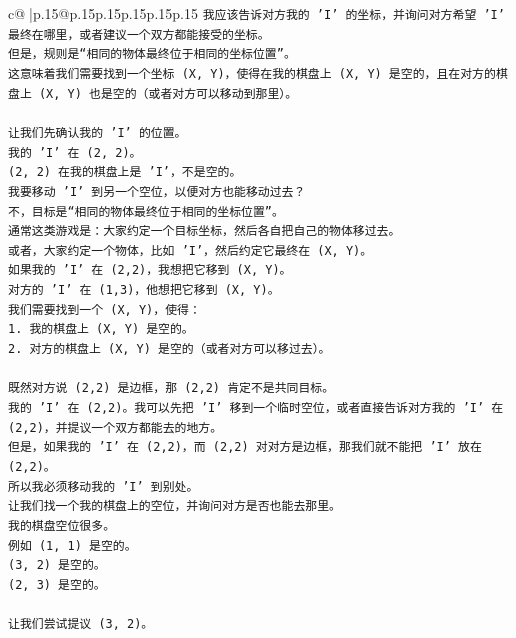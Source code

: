 \documentclass{article}
\begin{document}
{\begin{supertabular}{c@{$\;$}|p{.15\linewidth}@{}p{.15\linewidth}p{.15\linewidth}p{.15\linewidth}p{.15\linewidth}p{.15\linewidth}}
{{{\texttt{我应该告诉对方我的 'I' 的坐标，并询问对方希望 'I' 最终在哪里，或者建议一个双方都能接受的坐标。} \\
\texttt{但是，规则是“相同的物体最终位于相同的坐标位置”。} \\
\texttt{这意味着我们需要找到一个坐标 (X, Y)，使得在我的棋盘上 (X, Y) 是空的，且在对方的棋盘上 (X, Y) 也是空的（或者对方可以移动到那里）。} \\
\\ 
\texttt{让我们先确认我的 'I' 的位置。} \\
\texttt{我的 'I' 在 (2, 2)。} \\
\texttt{(2, 2) 在我的棋盘上是 'I'，不是空的。} \\
\texttt{我要移动 'I' 到另一个空位，以便对方也能移动过去？} \\
\texttt{不，目标是“相同的物体最终位于相同的坐标位置”。} \\
\texttt{通常这类游戏是：大家约定一个目标坐标，然后各自把自己的物体移过去。} \\
\texttt{或者，大家约定一个物体，比如 'I'，然后约定它最终在 (X, Y)。} \\
\texttt{如果我的 'I' 在 (2,2)，我想把它移到 (X, Y)。} \\
\texttt{对方的 'I' 在 (1,3)，他想把它移到 (X, Y)。} \\
\texttt{我们需要找到一个 (X, Y)，使得：} \\
\texttt{1. 我的棋盘上 (X, Y) 是空的。} \\
\texttt{2. 对方的棋盘上 (X, Y) 是空的（或者对方可以移过去）。} \\
\\ 
\texttt{既然对方说 (2,2) 是边框，那 (2,2) 肯定不是共同目标。} \\
\texttt{我的 'I' 在 (2,2)。我可以先把 'I' 移到一个临时空位，或者直接告诉对方我的 'I' 在 (2,2)，并提议一个双方都能去的地方。} \\
\texttt{但是，如果我的 'I' 在 (2,2)，而 (2,2) 对对方是边框，那我们就不能把 'I' 放在 (2,2)。} \\
\texttt{所以我必须移动我的 'I' 到别处。} \\
\texttt{让我们找一个我的棋盘上的空位，并询问对方是否也能去那里。} \\
\texttt{我的棋盘空位很多。} \\
\texttt{例如 (1, 1) 是空的。} \\
\texttt{(3, 2) 是空的。} \\
\texttt{(2, 3) 是空的。} \\
\\ 
\texttt{让我们尝试提议 (3, 2)。} \\
}}}
\end{supertabular}}
\end{document}
